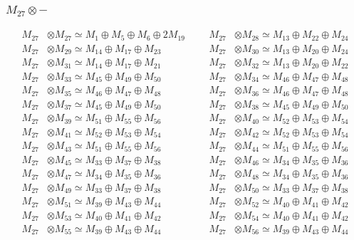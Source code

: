 \subsubsection{$ M_{27}\otimes -$}
\begin{align*}
M_{27} &\otimes M_{27} \simeq M_{1} \oplus M_{5} \oplus M_{6} \oplus 2M_{19} &&& M_{27} &\otimes M_{28} \simeq M_{13} \oplus M_{22} \oplus M_{24}\\
M_{27} &\otimes M_{29} \simeq M_{14} \oplus M_{17} \oplus M_{23} &&& M_{27} &\otimes M_{30} \simeq M_{13} \oplus M_{20} \oplus M_{24}\\
M_{27} &\otimes M_{31} \simeq M_{14} \oplus M_{17} \oplus M_{21} &&& M_{27} &\otimes M_{32} \simeq M_{13} \oplus M_{20} \oplus M_{22}\\
M_{27} &\otimes M_{33} \simeq M_{45} \oplus M_{49} \oplus M_{50} &&& M_{27} &\otimes M_{34} \simeq M_{46} \oplus M_{47} \oplus M_{48}\\
M_{27} &\otimes M_{35} \simeq M_{46} \oplus M_{47} \oplus M_{48} &&& M_{27} &\otimes M_{36} \simeq M_{46} \oplus M_{47} \oplus M_{48}\\
M_{27} &\otimes M_{37} \simeq M_{45} \oplus M_{49} \oplus M_{50} &&& M_{27} &\otimes M_{38} \simeq M_{45} \oplus M_{49} \oplus M_{50}\\
M_{27} &\otimes M_{39} \simeq M_{51} \oplus M_{55} \oplus M_{56} &&& M_{27} &\otimes M_{40} \simeq M_{52} \oplus M_{53} \oplus M_{54}\\
M_{27} &\otimes M_{41} \simeq M_{52} \oplus M_{53} \oplus M_{54} &&& M_{27} &\otimes M_{42} \simeq M_{52} \oplus M_{53} \oplus M_{54}\\
M_{27} &\otimes M_{43} \simeq M_{51} \oplus M_{55} \oplus M_{56} &&& M_{27} &\otimes M_{44} \simeq M_{51} \oplus M_{55} \oplus M_{56}\\
M_{27} &\otimes M_{45} \simeq M_{33} \oplus M_{37} \oplus M_{38} &&& M_{27} &\otimes M_{46} \simeq M_{34} \oplus M_{35} \oplus M_{36}\\
M_{27} &\otimes M_{47} \simeq M_{34} \oplus M_{35} \oplus M_{36} &&& M_{27} &\otimes M_{48} \simeq M_{34} \oplus M_{35} \oplus M_{36}\\
M_{27} &\otimes M_{49} \simeq M_{33} \oplus M_{37} \oplus M_{38} &&& M_{27} &\otimes M_{50} \simeq M_{33} \oplus M_{37} \oplus M_{38}\\
M_{27} &\otimes M_{51} \simeq M_{39} \oplus M_{43} \oplus M_{44} &&& M_{27} &\otimes M_{52} \simeq M_{40} \oplus M_{41} \oplus M_{42}\\
M_{27} &\otimes M_{53} \simeq M_{40} \oplus M_{41} \oplus M_{42} &&& M_{27} &\otimes M_{54} \simeq M_{40} \oplus M_{41} \oplus M_{42}\\
M_{27} &\otimes M_{55} \simeq M_{39} \oplus M_{43} \oplus M_{44} &&& M_{27} &\otimes M_{56} \simeq M_{39} \oplus M_{43} \oplus M_{44}\\
\end{align*}

